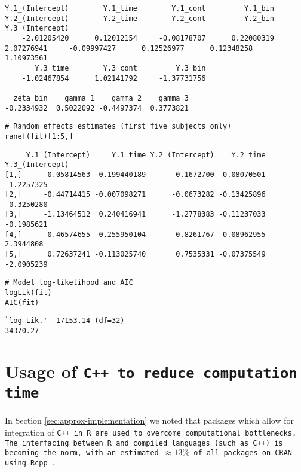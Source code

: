 \vspace*{-5mm}
\begin{small}
\begin{verbatim}
Y.1_(Intercept)        Y.1_time        Y.1_cont         Y.1_bin Y.2_(Intercept)        Y.2_time        Y.2_cont         Y.2_bin Y.3_(Intercept) 
    -2.01205420      0.12012154     -0.08178707      0.22080319      2.07276941     -0.09997427      0.12526977      0.12348258      1.10973561 
       Y.3_time        Y.3_cont         Y.3_bin 
    -1.02467854      1.02141792     -1.37731756     
  
  zeta_bin    gamma_1    gamma_2    gamma_3 
-0.2334932  0.5022092 -0.4497374  0.3773821     
\end{verbatim}
\end{small}
\begin{lstlisting}
# Random effects estimates (first five subjects only)
ranef(fit)[1:5,]
\end{lstlisting}
\vspace*{-5mm}
\begin{small}
\begin{verbatim}
     Y.1_(Intercept)     Y.1_time Y.2_(Intercept)    Y.2_time Y.3_(Intercept)
[1,]     -0.05814563  0.199440189      -0.1672700 -0.08070501      -1.2257325
[2,]     -0.44714415 -0.007098271      -0.0673282 -0.13425896      -0.3250280
[3,]     -1.13464512  0.240416941      -1.2778383 -0.11237033      -0.1985621
[4,]     -0.46574655 -0.255950104      -0.8261767 -0.08962955       2.3944808
[5,]      0.72637241 -0.113025740       0.7535331 -0.07375549      -2.0905239
\end{verbatim}
\end{small}
\begin{lstlisting}
# Model log-likelihood and AIC
logLik(fit)
AIC(fit)
\end{lstlisting}
\vspace*{-5mm}
\begin{small}
\begin{verbatim}
`log Lik.' -17153.14 (df=32)
34370.27
\end{verbatim}
\end{small}
\section{Usage of \tt{C++} to reduce computation time}\label{sec:appendix-gmvjoint-cpp}
In Section \ref{sec:approx-implementation} we noted that packages which allow for integration of \tt{C++} in \tt{R} are used to overcome computational bottlenecks. The interfacing between \tt{R} and compiled languages (such as \tt{C++}) is becoming the norm, with an estimated $\approx13\%$ of all packages on \tt{CRAN} using \tt{Rcpp} \citep{R-Rcpp}. 

